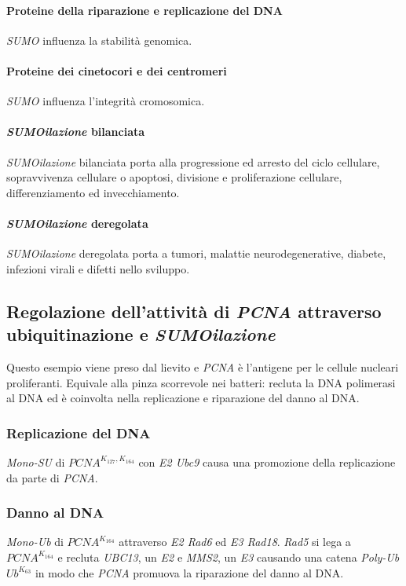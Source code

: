\paragraph{Proteine della riparazione e replicazione del DNA}
\emph{SUMO} influenza la stabilit\`a genomica.
\paragraph{Proteine dei cinetocori e dei centromeri}
\emph{SUMO} influenza l'integrit\`a cromosomica.
\paragraph{\emph{SUMOilazione} bilanciata}
\emph{SUMOilazione} bilanciata porta alla progressione ed arresto del ciclo cellulare, sopravvivenza cellulare o apoptosi, divisione e proliferazione cellulare, differenziamento ed invecchiamento.
\paragraph{\emph{SUMOilazione} deregolata}
\emph{SUMOilazione} deregolata porta a tumori, malattie neurodegenerative, diabete, infezioni virali e difetti nello sviluppo. 
\subsection{Regolazione dell'attivit\`a di \emph{PCNA} attraverso ubiquitinazione e \emph{SUMOilazione}}
Questo esempio viene preso dal lievito e \emph{PCNA} \`e l'antigene per le cellule nucleari proliferanti. 
Equivale alla pinza scorrevole nei batteri: recluta la DNA polimerasi al DNA ed \`e coinvolta nella replicazione e riparazione del danno al DNA.
\subsubsection{Replicazione del DNA}
\emph{Mono-SU} di \emph{$PCNA^{K_{127},K_{164}}$} con \emph{E2 Ubc9} causa una promozione della replicazione da parte di \emph{PCNA}.
\subsubsection{Danno al DNA}
\emph{Mono-Ub} di \emph{$PCNA^{K_{164}}$} attraverso \emph{E2 Rad6} ed \emph{E3 Rad18}. 
\emph{Rad5} si lega a \emph{$PCNA^{K_{164}}$} e recluta \emph{UBC13}, un \emph{E2} e \emph{MMS2}, un \emph{E3} causando una catena \emph{Poly-Ub} \emph{$Ub^{K_{63}}$} in modo che \emph{PCNA} promuova la riparazione del danno al DNA.
